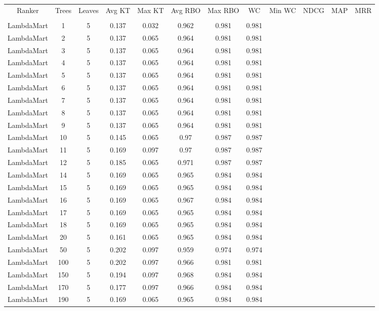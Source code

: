 \begin{longtable}{*{12}{c}}
Ranker & Trees & Leaves & Avg KT & Max KT & Avg RBO & Max RBO & WC & Min WC & NDCG & MAP & MRR  \\\\ 
LambdaMart & 1 & 5 & 0.137 & 0.032 & 0.962 & 0.981 & 0.981 \\ 
LambdaMart & 2 & 5 & 0.137 & 0.065 & 0.964 & 0.981 & 0.981 \\ 
LambdaMart & 3 & 5 & 0.137 & 0.065 & 0.964 & 0.981 & 0.981 \\ 
LambdaMart & 4 & 5 & 0.137 & 0.065 & 0.964 & 0.981 & 0.981 \\ 
LambdaMart & 5 & 5 & 0.137 & 0.065 & 0.964 & 0.981 & 0.981 \\ 
LambdaMart & 6 & 5 & 0.137 & 0.065 & 0.964 & 0.981 & 0.981 \\ 
LambdaMart & 7 & 5 & 0.137 & 0.065 & 0.964 & 0.981 & 0.981 \\ 
LambdaMart & 8 & 5 & 0.137 & 0.065 & 0.964 & 0.981 & 0.981 \\ 
LambdaMart & 9 & 5 & 0.137 & 0.065 & 0.964 & 0.981 & 0.981 \\ 
LambdaMart & 10 & 5 & 0.145 & 0.065 & 0.97 & 0.987 & 0.987 \\ 
LambdaMart & 11 & 5 & 0.169 & 0.097 & 0.97 & 0.987 & 0.987 \\ 
LambdaMart & 12 & 5 & 0.185 & 0.065 & 0.971 & 0.987 & 0.987 \\ 
LambdaMart & 14 & 5 & 0.169 & 0.065 & 0.965 & 0.984 & 0.984 \\ 
LambdaMart & 15 & 5 & 0.169 & 0.065 & 0.965 & 0.984 & 0.984 \\ 
LambdaMart & 16 & 5 & 0.169 & 0.065 & 0.967 & 0.984 & 0.984 \\ 
LambdaMart & 17 & 5 & 0.169 & 0.065 & 0.965 & 0.984 & 0.984 \\ 
LambdaMart & 18 & 5 & 0.169 & 0.065 & 0.965 & 0.984 & 0.984 \\ 
LambdaMart & 20 & 5 & 0.161 & 0.065 & 0.965 & 0.984 & 0.984 \\ 
LambdaMart & 50 & 5 & 0.202 & 0.097 & 0.959 & 0.974 & 0.974 \\ 
LambdaMart & 100 & 5 & 0.202 & 0.097 & 0.966 & 0.981 & 0.981 \\ 
LambdaMart & 150 & 5 & 0.194 & 0.097 & 0.968 & 0.984 & 0.984 \\ 
LambdaMart & 170 & 5 & 0.177 & 0.097 & 0.966 & 0.984 & 0.984 \\ 
LambdaMart & 190 & 5 & 0.169 & 0.065 & 0.965 & 0.984 & 0.984 \\ 

\end{longtable}
